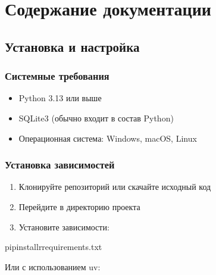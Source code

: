 \documentclass[a4paper,11pt,russian,openany,oneside]{sphinxmanual}
\begin{document}
\chapter{Содержание документации}
\label{\detokenize{index:id3}}
\sphinxstepscope


\section{Установка и настройка}
\label{\detokenize{installation:id1}}\label{\detokenize{installation::doc}}

\subsection{Системные требования}
\label{\detokenize{installation:id2}}\begin{itemize}
\item {} 
\sphinxAtStartPar
Python 3.13 или выше

\item {} 
\sphinxAtStartPar
SQLite3 (обычно входит в состав Python)

\item {} 
\sphinxAtStartPar
Операционная система: Windows, macOS, Linux

\end{itemize}


\subsection{Установка зависимостей}
\label{\detokenize{installation:id3}}\begin{enumerate}
%
\item {} 
\sphinxAtStartPar
Клонируйте репозиторий или скачайте исходный код

\item {} 
\sphinxAtStartPar
Перейдите в директорию проекта

\item {} 
\sphinxAtStartPar
Установите зависимости:

\end{enumerate}

\begin{sphinxVerbatim}[commandchars=\\\{\}]
pipinstall\PYGZhy{}rrequirements.txt
\end{sphinxVerbatim}

\sphinxAtStartPar
Или с использованием uv:
\end{document}
